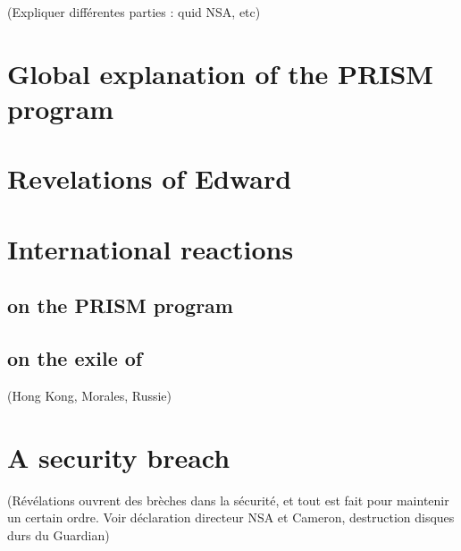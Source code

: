 \documentclass{article}
\begin{document}
\setcounter{tocdepth}{4}
\tableofcontents
\newpage


(Expliquer différentes parties : quid NSA, etc)
\section{Global explanation of the PRISM program}


\section{Revelations of Edward }


\section{International reactions}
\subsection{on the PRISM program}

\subsection{on the exile of }
(Hong Kong, Morales, Russie)

\section{A security breach}
(Révélations ouvrent des brèches dans la sécurité, et tout est fait pour maintenir un certain ordre. Voir déclaration directeur NSA et Cameron, destruction disques durs du Guardian)




\end{document}
